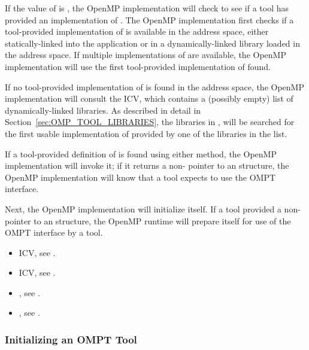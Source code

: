 If the value of  is , the OpenMP
implementation will check to see if a tool has provided an
implementation of .  The OpenMP implementation first
checks if a tool-provided implementation of  is
available in the address space, either statically-linked into the
application or in a dynamically-linked library loaded in the address
space. If multiple implementations of  are available,
the OpenMP implementation will use the first tool-provided
implementation of  found.

If no tool-provided implementation of  is found in
the address space, the OpenMP implementation will consult the
 ICV, which contains a (possibly empty) list
of dynamically-linked libraries.  As described in detail in
Section~\ref{sec:OMP_TOOL_LIBRARIES}, the libraries in
, will be searched for the first usable
implementation of  provided by one of the libraries
in the list.

If a tool-provided definition of  is found using
either method, the OpenMP implementation will invoke it; if it returns
a non- pointer to an  structure,
the OpenMP implementation will know
that a tool expects to use the OMPT interface.

Next, the OpenMP implementation will initialize itself. If a tool
provided a non- pointer to an  structure,
the OpenMP runtime will prepare itself for use of the OMPT interface by a tool.

\crossreferences
\begin{itemize}
\item {} ICV, see .
\item {} ICV, see .
\item {}, see .
\item {}, see .
\end{itemize}

\subsubsection{Initializing an OMPT Tool}
\label{sec:tool-initialize}

